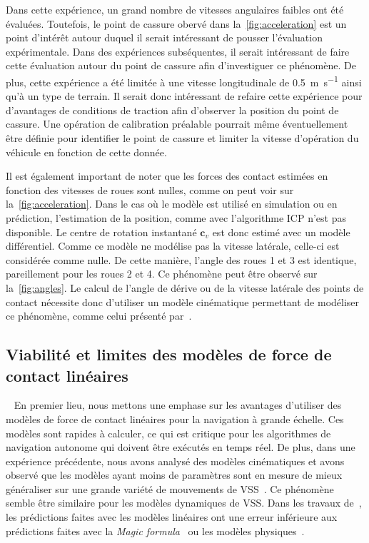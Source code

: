 Dans cette expérience, un grand nombre de vitesses angulaires faibles ont été évaluées.
Toutefois, le point de cassure obervé dans la~\autoref{fig:acceleration} est un point d'intérêt autour duquel il serait intéressant de pousser l'évaluation expérimentale.
Dans des expériences subséquentes, il serait intéressant de faire cette évaluation autour du point de cassure afin d'investiguer ce phénomène.
De plus, cette expérience a été limitée à une vitesse longitudinale de \SI{0.5}{\meter\per\second} ainsi qu'à un type de terrain.
Il serait donc intéressant de refaire cette expérience pour d'avantages de conditions de traction afin d'observer la position du point de cassure.
Une opération de calibration préalable pourrait même éventuellement être définie pour identifier le point de cassure et limiter la vitesse d'opération du véhicule en fonction de cette donnée.

Il est également important de noter que les forces des contact estimées en fonction des vitesses de roues sont nulles, comme on peut voir sur la~\autoref{fig:acceleration}.
Dans le cas où le modèle est utilisé en simulation ou en prédiction, l'estimation de la position, comme avec l'algorithme \ac{ICP} n'est pas disponible.
Le centre de rotation instantané $\bm c_v$ est donc estimé avec un modèle différentiel.
Comme ce modèle ne modélise pas la vitesse latérale, celle-ci est considérée comme nulle. 
De cette manière, l'angle des roues 1 et 3 est identique, pareillement pour les roues 2 et 4.
Ce phénomène peut être observé sur la~\autoref{fig:angles}.
Le calcul de l'angle de dérive ou de la vitesse latérale des points de contact nécessite donc d'utiliser un modèle cinématique permettant de modéliser ce phénomène, comme celui présenté par~\citep{Seegmiller2014}.

\subsection{Viabilité et limites des modèles de force de contact linéaires}~\label{sec:ana_lineaire}
En premier lieu, nous mettons une emphase sur les avantages d'utiliser des modèles de force de contact linéaires pour la navigation à grande échelle.
Ces modèles sont rapides à calculer, ce qui est critique pour les algorithmes de navigation autonome qui doivent être exécutés en temps réel.
De plus, dans une expérience précédente, nous avons analysé des modèles cinématiques et avons observé que les modèles ayant moins de paramètres sont en mesure de mieux généraliser sur une grande variété de mouvements de \ac{VSS}~\citep{Baril2020}.
Ce phénomène semble être similaire pour les modèles dynamiques de \ac{VSS}. 
Dans les travaux de~\citet{Seegmiller2016}, les prédictions faites avec les modèles linéaires ont une erreur inférieure aux prédictions faites avec la \textit{Magic formula}~\citep{Pacejka2012} ou les modèles physiques~\citep{Ishigami2007}.

